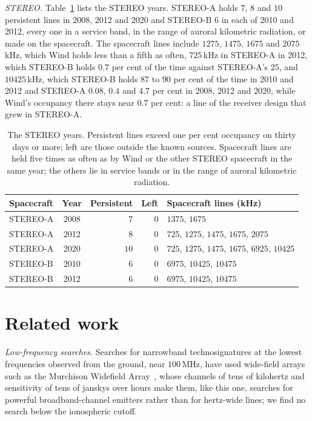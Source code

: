 \documentclass[3p,11pt]{elsarticle}
\begin{document}
\emph{STEREO.} Table~\ref{tab:stereo} lists the STEREO years. STEREO-A holds $7$, $8$
and $10$ persistent lines in 2008, 2012 and 2020 and STEREO-B $6$ in each of 2010 and
2012, every one in a service band, in the range of auroral kilometric radiation, or made
on the spacecraft. The spacecraft lines include
$1275$, $1475$, $1675$ and $2075$\,kHz, which Wind holds less than a fifth as often,
$725$\,kHz in STEREO-A in 2012, which STEREO-B holds $0.7$ per cent of the time against
STEREO-A's $25$, and $10425$\,kHz, which STEREO-B holds $87$ to $90$ per cent of the time
in 2010 and 2012 and STEREO-A $0.08$, $0.4$ and $4.7$ per cent in 2008, 2012 and 2020,
while Wind's occupancy there stays near $0.7$ per cent: a line of the receiver design
that grew in STEREO-A.

\begin{table}[t]
\centering\small
\caption{The STEREO years. Persistent lines exceed one per cent occupancy on thirty days
or more; left are those outside the known sources. Spacecraft lines are held five times
as often as by Wind or the other STEREO spacecraft in the same year; the others lie in
service bands or in the range of auroral kilometric radiation.}
\label{tab:stereo}
\begin{tabular}{l c r r >{\raggedright\arraybackslash}p{}}
\toprule
Spacecraft & Year & Persistent & Left & Spacecraft lines (kHz) \\
\midrule
STEREO-A & 2008 & $7$ & $0$ & $1375$, $1675$ \\
STEREO-A & 2012 & $8$ & $0$ & $725$, $1275$, $1475$, $1675$, $2075$ \\
STEREO-A & 2020 & $10$ & $0$ & $725$, $1275$, $1475$, $1675$, $6925$, $10425$ \\
STEREO-B & 2010 & $6$ & $0$ & $6975$, $10425$, $10475$ \\
STEREO-B & 2012 & $6$ & $0$ & $6975$, $10425$, $10475$ \\
\bottomrule
\end{tabular}
\end{table}

\section{Related work}\label{sec:related}

\emph{Low-frequency searches.} Searches for narrowband technosignatures at the lowest
frequencies observed from the ground, near $100$\,MHz, have used wide-field arrays such
as the Murchison Widefield Array~\cite{Tingay2016}, whose channels of tens of kilohertz
and sensitivity of tens of janskys over hours make them, like this one, searches for
powerful broadband-channel emitters rather than for hertz-wide lines; we find no search
below the ionospheric cutoff.
\end{document}
